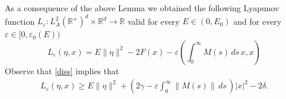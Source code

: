 \documentclass[11pt, leqno]{amsart}
\newtheorem{lem}[thm]{Lemma}
\theoremstyle{definition}
\def\R{\mathbb{R}}
\begin{document}
As a consequence of the above Lemma we obtained the following Lyapunov function  
$L_\varepsilon:L^2_A(\mathbb{R}^+)^d\times \mathbb{R}^d \to \R $ valid for every $E\in (0,E_0)$ and for every $\varepsilon \in [0,\varepsilon_0(E))$
\begin{equation}\label{eq:lyapunov}
	L_\varepsilon(\eta,x)=E\|\eta\|^2-2F(x) - \varepsilon\left(\int_0^\infty M(s)\, ds\,  x,x\right)
\end{equation}
Observe that  \eqref{diss} implies that
\begin{eqnarray} \label{eq:Lap-lbnd}
  L_\varepsilon(\eta,x)  \geq E\|\eta\|^2 + \left(2 \gamma  - \varepsilon\int_0^\infty \|M(s)\|\, ds\,\right)|x|^2 - 2 \delta.
\end{eqnarray}


\end{document}
